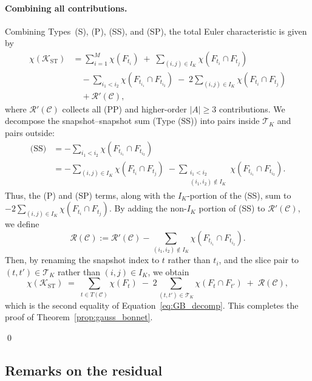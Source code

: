 \documentclass[
    pre,
    twocolumn,
    superscriptaddress,
    showpacs,
    nofootinbib,
    amsmath,
    amssymb,
    floatfix
]{revtex4-2}
\newcommand{\K}{\mathcal{K}}
\theoremstyle{plain} %
\theoremstyle{definition} %
\begin{document}
\paragraph{Combining all contributions.}
Combining Types~(S), (P), (SS), and (SP), the total Euler characteristic is given by
\begin{align*}
    \chi(\K_{\mathrm{ST}})
    &= \sum_{i=1}^M \chi(F_{t_i})
       \;+\;\!\!\sum_{(i,j) \in I_K}\!\! \chi(F_{t_i} \cap F_{t_j}) \\
    &\quad - \sum_{i_1 < i_2}\!\! \chi(F_{t_{i_1}} \cap F_{t_{i_2}})
       \;-\; 2\!\!\sum_{(i,j) \in I_K}\!\! \chi(F_{t_i} \cap F_{t_j}) \\
    &\quad + \mathcal{R}'(\mathcal{C}),
\end{align*}
where $\mathcal{R}'(\mathcal{C})$ collects all (PP) and higher-order $|A| \ge 3$ contributions.
We decompose the snapshot--snapshot sum (Type (SS)) into pairs inside $\mathcal{T}_K$ and pairs outside:
\begin{align*}
    \text{(SS)}
    &= - \sum_{i_1 < i_2} \chi(F_{t_{i_1}} \cap F_{t_{i_2}}) \nonumber\\
    &= -\!\!\sum_{(i,j) \in I_K}\!\! \chi(F_{t_i} \cap F_{t_j})
       \;-\!\!\sum_{\substack{i_1 < i_2 \\ (i_1, i_2) \notin I_K}}\!\!
            \chi(F_{t_{i_1}} \cap F_{t_{i_2}}).
\end{align*}
Thus, the (P) and (SP) terms, along with the $I_K$-portion of the (SS), sum to $-2\!\!\sum_{(i,j) \in I_K}\!\!\chi(F_{t_i} \cap F_{t_j})$. By adding the non-$I_K$ portion of (SS) to $\mathcal{R}'(\mathcal{C})$, we define 
\begin{equation*}
    \mathcal{R}(\mathcal{C}) := \mathcal{R}'(\mathcal{C}) - \sum_{(i_1,i_2) \notin I_K} \chi(F_{t_{i_1}} \cap F_{t_{i_2}}).
\end{equation*}
Then, by renaming the snapshot index to $t$ rather than $t_i$, and the slice pair to $(t, t') \in \mathcal{T}_K$ rather than $(i, j) \in I_K$, we obtain
\begin{equation*}
    \chi(\K_{\mathrm{ST}})
    \;=\;
    \sum_{t \in T(\mathcal{C})}\!\chi(F_t)
    \;-\;2\!\!\sum_{(t,t') \in \mathcal{T}_K}\!\!\chi(F_t \cap F_{t'})
    \;+\; \mathcal{R}(\mathcal{C}),
\end{equation*}
which is the second equality of Equation~\eqref{eq:GB_decomp}.
This completes the proof of Theorem~\ref{prop:gauss_bonnet}.

\qed

\subsection{Remarks on the residual}\label{app:residual}
\end{document}
